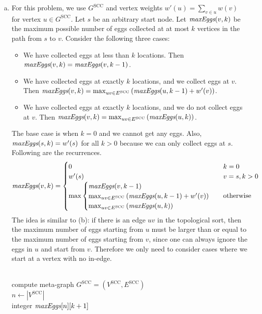 \documentclass[11pt]{article}
\begin{document}
\begin{solution}
\begin{enumerate}[(a)]
\item For this problem, we use $G^{\text{SCC}}$ and vertex weights $w'(u)=\sum_{v\in u}{w(v)}$ for vertex $u\in G^{\text{SCC}}$. Let $s$ be an arbitrary start node. Let $\emph{maxEggs}(v,k)$ be the maximum possible number of eggs collected at at most $k$ vertices in the path from $s$ to $v$. Consider the following three cases:
\begin{itemize}
\item We have collected eggs at less than $k$ locations. Then $\emph{maxEggs}(v,k)=\emph{maxEggs}(v,k-1)$.
\item We have collected eggs at exactly $k$ locations, and we collect eggs at $v$. Then $\emph{maxEggs}(v,k)=\max_{uv\in E^{\text{SCC}}}{(\emph{maxEggs}(u, k-1)+w'(v))}$.
\item We have collected eggs at exactly $k$ locations, and we do not collect eggs at $v$. Then $\emph{maxEggs}(v,k)=\max_{uv\in E^{\text{SCC}}}{(\emph{maxEggs}(u, k))}$.
\end{itemize}
The base case is when $k=0$ and we cannot get any eggs. Also, $\emph{maxEggs}(s,k)=w'(s)$ for all $k>0$ because we can only collect eggs at $s$. Following are the recurrences.
\begin{equation*}
\emph{maxEggs}(v, k)=
\begin{cases}
	0 &k=0
\\	w'(s) &v=s, k>0
\\	\max
\begin{cases}
	\emph{maxEggs}(v,k-1)
\\	\max_{uv\in E^{\text{SCC}}}{(\emph{maxEggs}(u, k-1)+w'(v))}
\\	\max_{uv\in E^{\text{SCC}}}{(\emph{maxEggs}(u, k))}
\end{cases}
&\text{otherwise}
\end{cases}
\end{equation*}
The idea is similar to (b): if there is an edge $uv$ in the topological sort, then the maximum number of eggs starting from $u$ must be larger than or equal to the maximum number of eggs starting from $v$, since one can always ignore the eggs in $u$ and start from $v$. Therefore we only need to consider cases where we start at a vertex with no in-edge.
\begin{algo}
	\textsc{}
\\	compute meta-graph $G^{\text{SCC}}=(V^{\text{SCC}}, E^{\text{SCC}})$
\\	$n\gets |V^{\text{SCC}}|$
\\	integer $\emph{maxEggs}[n][k+1]$

\end{algo}
\end{enumerate}
\end{solution}
\end{document}
